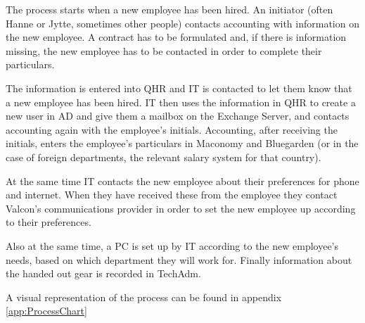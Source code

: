 The process starts when a new employee has been hired.
An initiator (often Hanne or Jytte, sometimes other people) contacts accounting with information on the new employee.
A contract has to be formulated and, if there is information missing, the new employee has to be contacted in order to complete their particulars.

The information is entered into QHR and IT is contacted to let them know that a new employee has been hired.
IT then uses the information in QHR to create a new user in AD and give them a mailbox on the Exchange Server, and contacts accounting again with the employee's initials.
Accounting, after receiving the initials, enters the employee's particulars in Maconomy and Bluegarden (or in the case of foreign departments, the relevant salary system for that country).

At the same time IT contacts the new employee about their preferences for phone and internet.
When they have received these from the employee they contact Valcon's communications provider in order to set the new employee up according to their preferences.

Also at the same time, a PC is set up by IT according to the new employee's needs, based on which department they will work for.
Finally information about the handed out gear is recorded in TechAdm.


A visual representation of the process can be found in appendix \ref{app:ProcessChart} 